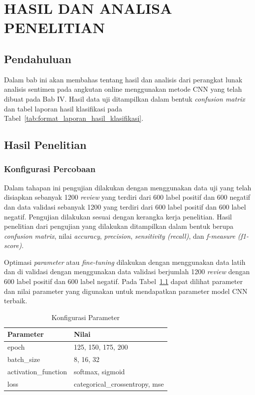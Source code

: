 \pagestyle{fancy}
\rhead{}
\setcounter{page}{1}
\chapter{HASIL DAN ANALISA PENELITIAN}

\section{Pendahuluan}
Dalam bab ini akan membahas tentang hasil dan analisis dari perangkat lunak analisis sentimen
pada angkutan online menggunakan metode CNN yang telah dibuat pada Bab IV. Hasil data uji ditampilkan
dalam bentuk \emph{confusion matrix} dan tabel laporan hasil klasifikasi pada
Tabel~\ref{tab:format_laporan_hasil_klasifikasi}.


\section{Hasil Penelitian}

\subsection{Konfigurasi Percobaan}
Dalam tahapan ini pengujian dilakukan dengan menggunakan data uji yang telah disiapkan sebanyak 1200
\emph{review} yang terdiri dari 600 label positif dan 600 negatif dan data validasi sebanyak 1200
yang terdiri dari 600 label positif dan 600 label negatif. Pengujian dilakukan sesuai dengan kerangka
kerja penelitian. Hasil penelitian dari pengujian yang dilakukan ditampilkan dalam bentuk berupa
\emph{confusion matrix}, nilai \emph{accuracy}, \emph{precision}, \emph{sensitivity (recall)}, dan
\emph{f-measure (f1-score)}.

Optimasi \emph{parameter} atau \emph{fine-tuning} dilakukan dengan menggunakan data latih dan di
validasi dengan menggunakan data validasi berjumlah 1200 \emph{review} dengan 600 label positif dan 600
label negatif. Pada Tabel~\ref{tab:config_fine_tuning} dapat dilihat parameter dan nilai parameter
yang digunakan untuk mendapatkan parameter model CNN terbaik.

\begin{table}[H]
  \centering
  \caption{Konfigurasi Parameter}
  \label{tab:config_fine_tuning}
  \begin{tabularx}{\columnwidth}{|l|l|}
    \hline
    Parameter            & Nilai                          \\ \hline
    epoch                & 125, 150, 175, 200             \\ \hline
    batch\_size          & 8, 16, 32                      \\ \hline
    activation\_function & softmax, sigmoid               \\ \hline
    loss                 & categorical\_crossentropy, mse \\ \hline
  \end{tabularx}
\end{table} \newpage

